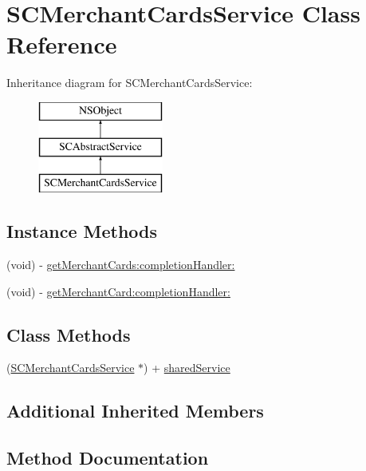 \hypertarget{interface_s_c_merchant_cards_service}{}\section{S\+C\+Merchant\+Cards\+Service Class Reference}
\label{interface_s_c_merchant_cards_service}
Inheritance diagram for S\+C\+Merchant\+Cards\+Service\+:\begin{figure}[H]
\begin{center}
\leavevmode
\includegraphics[height=3.000000cm]{interface_s_c_merchant_cards_service}
\end{center}
\end{figure}
\subsection*{Instance Methods}
\begin{DoxyCompactItemize}
\item 
(void) -\/ \hyperlink{interface_s_c_merchant_cards_service_a17cbbc59af2642cf55b553178ead5a9a}{get\+Merchant\+Cards\+:completion\+Handler\+:}
\item 
(void) -\/ \hyperlink{interface_s_c_merchant_cards_service_a05e149d2a9c8c66b99498c1a85c1b571}{get\+Merchant\+Card\+:completion\+Handler\+:}
\end{DoxyCompactItemize}
\subsection*{Class Methods}
\begin{DoxyCompactItemize}
\item 
(\hyperlink{interface_s_c_merchant_cards_service}{S\+C\+Merchant\+Cards\+Service} $\ast$) + \hyperlink{interface_s_c_merchant_cards_service_ac2167f5e35f731ec665d0e9eda1f4688}{shared\+Service}
\end{DoxyCompactItemize}
\subsection*{Additional Inherited Members}


\subsection{Method Documentation}
